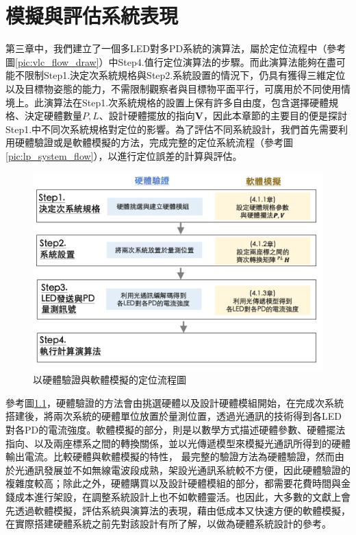 \chapter{模擬與評估系統表現}
\label{chp:4}


第三章中，我們建立了一個多LED對多PD系統的演算法，屬於定位流程中（參考圖\ref{pic:vlc_flow_draw}）中Step4.值行定位演算法的步驟。而此演算法能夠在盡可能不限制Step1.決定次系統規格與Step2.系統設置的情況下，仍具有獲得三維定位以及目標物姿態的能力，不需限制觀察者與目標物平面平行，可廣用於不同使用情境上。此演算法在Step1.次系統規格的設置上保有許多自由度，包含選擇硬體規格、決定硬體數量$P,L$、設計硬體擺放的指向$\boldsymbol{V}$，因此本章節的主要目的便是探討Step1.中不同次系統規格對定位的影響。為了評估不同系統設計，我們首先需要利用硬體驗證或是軟體模擬的方法，完成完整的定位系統流程（參考圖\ref{pic:lp_system_flow}），以進行定位誤差的計算與評估。

\begin{figure}[htpb]
    \centering
    \includegraphics[width=15cm]{ch4pic/simulate_hardware.png}
    \caption{以硬體驗證與軟體模擬的定位流程圖}
    \label{pic:simulate_hardware}
\end{figure}

參考圖\ref{pic:simulate_hardware}，硬體驗證的方法會由挑選硬體以及設計硬體模組開始，在完成次系統搭建後，將兩次系統的硬體單位放置於量測位置，透過光通訊的技術得到各LED對各PD的電流強度。軟體模擬的部分，則是以數學方式描述硬體參數、硬體擺法指向、以及兩座標系之間的轉換關係，並以光傳遞模型來模擬光通訊所得到的硬體輸出電流。比較硬體與軟體模擬的特性， 最完整的驗證方法為硬體驗證，然而由於光通訊發展並不如無線電波段成熟，架設光通訊系統較不方便，因此硬體驗證的複雜度較高；除此之外，硬體購買以及設計硬體模組的部分，都需要花費時間與金錢成本進行架設，在調整系統設計上也不如軟體靈活。也因此，大多數的文獻上會先透過軟體模擬，評估系統與演算法的表現，藉由低成本又快速方便的軟體模擬，在實際搭建硬體系統之前先對該設計有所了解，以做為硬體系統設計的參考。

